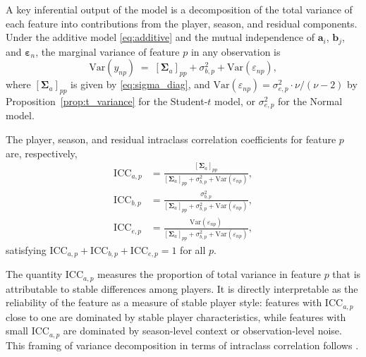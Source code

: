 A key inferential output of the model is a decomposition of the total variance of each feature into contributions from the player, season, and residual components. Under the additive model \eqref{eq:additive} and the mutual independence of $\mathbf{a}_i$, $\mathbf{b}_j$, and $\boldsymbol{\varepsilon}_n$, the marginal variance of feature $p$ in any observation is
\begin{equation}
\mathrm{Var}(y_{np}) \;=\; [\boldsymbol{\Sigma}_a]_{pp} + \sigma_{b,p}^2 + \mathrm{Var}(\varepsilon_{np}),
\label{eq:total_variance}
\end{equation}
where $[\boldsymbol{\Sigma}_a]_{pp}$ is given by \eqref{eq:sigma_diag}, and $\mathrm{Var}(\varepsilon_{np}) = \sigma_{e,p}^2 \cdot \nu/(\nu-2)$ by Proposition~\ref{prop:t_variance} for the Student-$t$ model, or $\sigma_{e,p}^2$ for the Normal model.

\begin{definition}
\label{def:icc}
The player, season, and residual intraclass correlation coefficients for feature $p$ are, respectively,
\begin{align}
\mathrm{ICC}_{a,p} &= \frac{[\boldsymbol{\Sigma}_a]_{pp}}{[\boldsymbol{\Sigma}_a]_{pp} + \sigma_{b,p}^2 + \mathrm{Var}(\varepsilon_{np})},
\label{eq:icc_a} \\[4pt]
\mathrm{ICC}_{b,p} &= \frac{\sigma_{b,p}^2}{[\boldsymbol{\Sigma}_a]_{pp} + \sigma_{b,p}^2 + \mathrm{Var}(\varepsilon_{np})},
\label{eq:icc_b} \\[4pt]
\mathrm{ICC}_{e,p} &= \frac{\mathrm{Var}(\varepsilon_{np})}{[\boldsymbol{\Sigma}_a]_{pp} + \sigma_{b,p}^2 + \mathrm{Var}(\varepsilon_{np})},
\label{eq:icc_e}
\end{align}
satisfying $\mathrm{ICC}_{a,p} + \mathrm{ICC}_{b,p} + \mathrm{ICC}_{e,p} = 1$ for all $p$.
\end{definition}

The quantity $\mathrm{ICC}_{a,p}$ measures the proportion of total variance in feature $p$ that is attributable to stable differences among players. It is directly interpretable as the reliability of the feature as a measure of stable player style: features with $\mathrm{ICC}_{a,p}$ close to one are dominated by stable player characteristics, while features with small $\mathrm{ICC}_{a,p}$ are dominated by season-level context or observation-level noise. This framing of variance decomposition in terms of intraclass correlation follows \cite{shrout1979intraclass}.


